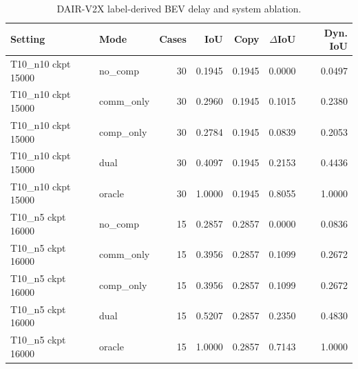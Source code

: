 \begin{table}[t]
\centering
\scriptsize
\caption{DAIR-V2X label-derived BEV delay and system ablation.}
\label{tab:dair-delay-system}
\begin{tabular}{llrrrrr}
\toprule
Setting & Mode & Cases & IoU & Copy & $\Delta$IoU & Dyn. IoU \\
\midrule
T10\_n10 ckpt 15000 & no\_comp & 30 & 0.1945 & 0.1945 & 0.0000 & 0.0497 \\
T10\_n10 ckpt 15000 & comm\_only & 30 & 0.2960 & 0.1945 & 0.1015 & 0.2380 \\
T10\_n10 ckpt 15000 & comp\_only & 30 & 0.2784 & 0.1945 & 0.0839 & 0.2053 \\
T10\_n10 ckpt 15000 & dual & 30 & 0.4097 & 0.1945 & 0.2153 & 0.4436 \\
T10\_n10 ckpt 15000 & oracle & 30 & 1.0000 & 0.1945 & 0.8055 & 1.0000 \\
T10\_n5 ckpt 16000 & no\_comp & 15 & 0.2857 & 0.2857 & 0.0000 & 0.0836 \\
T10\_n5 ckpt 16000 & comm\_only & 15 & 0.3956 & 0.2857 & 0.1099 & 0.2672 \\
T10\_n5 ckpt 16000 & comp\_only & 15 & 0.3956 & 0.2857 & 0.1099 & 0.2672 \\
T10\_n5 ckpt 16000 & dual & 15 & 0.5207 & 0.2857 & 0.2350 & 0.4830 \\
T10\_n5 ckpt 16000 & oracle & 15 & 1.0000 & 0.2857 & 0.7143 & 1.0000 \\
\bottomrule
\end{tabular}
\end{table}
